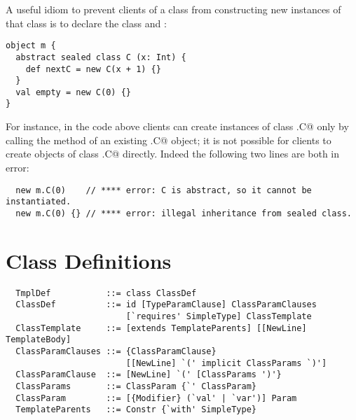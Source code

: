 \example A useful idiom to prevent clients of a class from
constructing new instances of that class is to declare the class
 and :

\begin{lstlisting}
object m {
  abstract sealed class C (x: Int) {
    def nextC = new C(x + 1) {}
  }
  val empty = new C(0) {}
}
\end{lstlisting}
For instance, in the code above clients can create instances of class
\lstinline@m.C@ only by calling the  method of an existing \lstinline@m.C@
object; it is not possible for clients to create objects of class
\lstinline@m.C@ directly. Indeed the following two lines are both in error:

\begin{lstlisting}
  new m.C(0)    // **** error: C is abstract, so it cannot be instantiated.
  new m.C(0) {} // **** error: illegal inheritance from sealed class.
\end{lstlisting}

\section{Class Definitions}
\label{sec:class-defs}

\syntax\begin{lstlisting} 
  TmplDef           ::= class ClassDef 
  ClassDef          ::= id [TypeParamClause] ClassParamClauses 
                        [`requires' SimpleType] ClassTemplate 
  ClassTemplate     ::= [extends TemplateParents] [[NewLine] TemplateBody]
  ClassParamClauses ::= {ClassParamClause} 
                        [[NewLine] `(' implicit ClassParams `)']
  ClassParamClause  ::= [NewLine] `(' [ClassParams ')'} 
  ClassParams       ::= ClassParam {`' ClassParam}
  ClassParam        ::= [{Modifier} (`val' | `var')] Param
  TemplateParents   ::= Constr {`with' SimpleType}
\end{lstlisting}

